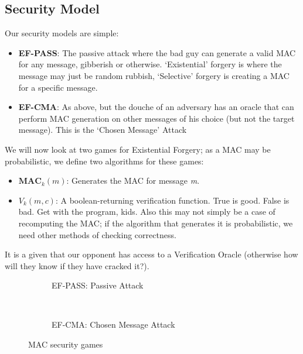     \subsection{Security Model}
    Our security models are simple:
    \begin{itemize}
        \item \textbf{EF-PASS}: The passive attack where the bad guy can generate a valid MAC for any message, gibberish or otherwise. 
        `Existential' forgery is where the message may just be random rubbish, `Selective' forgery is creating a MAC for a specific message.

        \item \textbf{EF-CMA}: As above, but the douche of an adversary has an oracle that can perform MAC generation on other messages of his choice (but not the target message). This is the `Chosen Message' Attack
    \end{itemize}

    We will now look at two games for Existential Forgery; as a MAC may be probabilistic, we define two algorithms for these games:

    \begin{itemize}
        \item $\textbf{MAC}_{k}(m)$: Generates the MAC for message \emph{m}.
        \item $V_{k}(m, c)$: A boolean-returning verification function. True is good. False is bad. Get with the program, kids. Also this may not simply be a case of recomputing the MAC; if the algorithm that generates it is probabilistic, we need other methods of checking correctness.
    \end{itemize}

    It is a given that our opponent has access to a Verification Oracle (otherwise how will they know if they have cracked it?). 

    \begin{figure}[htp!]
    \centering
    \begin{subfigure}[b]{0.4\textwidth}
        \centering
        \begin{cryptogame}{}
            \cgameleft{$\cmast$, $\ccast$}
        \end{cryptogame}
        \caption{EF-PASS: Passive Attack}
        \label{fig:ef-pass}
    \end{subfigure}
    ~
    \begin{subfigure}[b]{0.4\textwidth}
        \centering
        \begin{cryptogame}{}
            \cgameleft{$\cmast$, $\ccast$}
        \end{cryptogame}
        \caption{EF-CMA: Chosen Message Attack}
        \label{fig:ef-cma}
    \end{subfigure}
    \caption{MAC security games}
    \label{fig:ef-games}
\end{figure}

